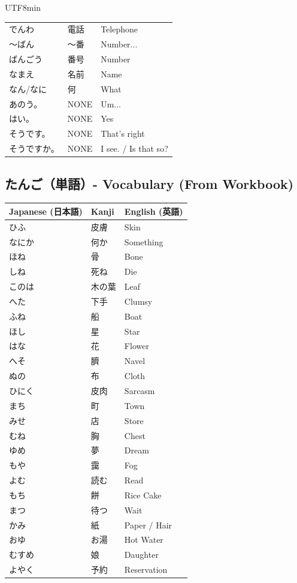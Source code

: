 \documentclass[11pt]{article}
\begin{document}
\begin{CJK}{UTF8}{min}
\begin{tabularx}{\textwidth}{X | X | X}
    でんわ & 電話 & Telephone \\
    〜ばん & 〜番 & Number...\\
    ばんごう & 番号 & Number \\
    なまえ & 名前 & Name \\
    なん/なに & 何 & What \\
    あのう。 & NONE & Um...\\
    はい。 & NONE & Yes \\
    そうです。 & NONE & That's right \\
    そうですか。 & NONE & I see. / Is that so? \\
    \bottomrule
\end{tabularx}

\subsection{たんご（単語）- Vocabulary (From Workbook)}
\begin{tabularx}{\linewidth}{X | X | X}
    \toprule
    \textbf{Japanese (日本語)} & \textbf{Kanji} & \textbf{English (英語)} \\
    \midrule
    ひふ & 皮膚 & Skin \\
    なにか & 何か & Something \\
    ほね & 骨 & Bone \\
    しね & 死ね & Die \\
    このは & 木の葉 & Leaf \\
    へた & 下手 & Clumsy \\
    ふね & 船 & Boat \\
    ほし & 星 & Star \\
    はな & 花 & Flower \\
    へそ & 臍 & Navel \\
    ぬの & 布 & Cloth \\
    ひにく & 皮肉 & Sarcasm \\
    まち & 町 & Town \\
    みせ & 店 & Store \\
    むね & 胸 & Chest \\
    ゆめ & 夢 & Dream \\
    もや & 靄 & Fog \\
    よむ & 読む & Read \\
    もち & 餅 & Rice Cake \\
    まつ & 待つ & Wait \\
    かみ & 紙 & Paper / Hair \\
    おゆ & お湯 & Hot Water \\
    むすめ & 娘 & Daughter \\
    よやく & 予約 & Reservation \\
    \bottomrule
\end{tabularx}


\end{CJK}
\end{document}
